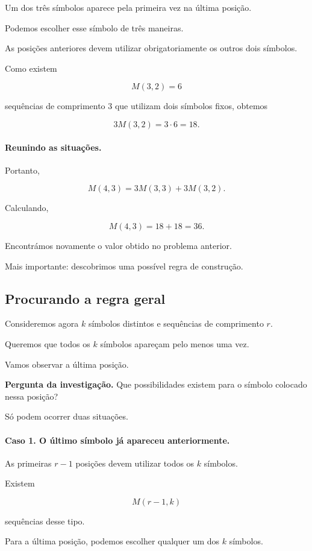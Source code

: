 \documentclass[11pt,a4paper,oneside]{book}
\newcommand{\Pergunta}[1]{\begin{perguntabox}\textbf{Pergunta da investigação.} #1\end{perguntabox}}
\begin{document}
Um dos três símbolos aparece
pela primeira vez na última posição.

Podemos escolher esse símbolo
de três maneiras.

As posições anteriores devem
utilizar obrigatoriamente os
outros dois símbolos.

Como existem

\[
M(3,2)=6
\]

sequências de comprimento $3$
que utilizam dois símbolos fixos,
obtemos

\[
3M(3,2)=3\cdot6=18.
\]

\paragraph{Reunindo as situações.}

Portanto,

\[
M(4,3)=3M(3,3)+3M(3,2).
\]

Calculando,

\[
M(4,3)=18+18=36.
\]

Encontrámos novamente o valor
obtido no problema anterior.

Mais importante: descobrimos
uma possível regra de construção.

\subsection*{Procurando a regra geral}

Consideremos agora $k$ símbolos distintos
e sequências de comprimento $r$.

Queremos que todos os $k$ símbolos
apareçam pelo menos uma vez.

Vamos observar a última posição.

\Pergunta{Que possibilidades existem
para o símbolo colocado nessa posição?}

Só podem ocorrer duas situações.

\paragraph{Caso 1. O último símbolo
já apareceu anteriormente.}

As primeiras $r-1$ posições
devem utilizar todos os $k$ símbolos.

Existem

\[
M(r-1,k)
\]

sequências desse tipo.

Para a última posição, podemos escolher
qualquer um dos $k$ símbolos.
\end{document}
